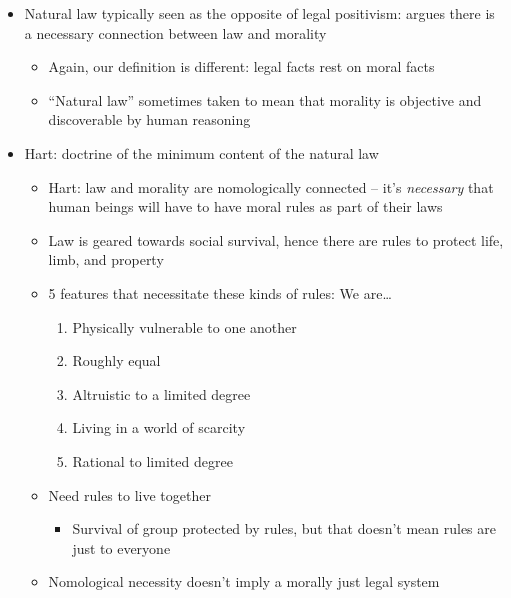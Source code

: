 \begin{itemize}
\tightlist
\item
  Natural law typically seen as the opposite of legal positivism: argues
  there is a necessary connection between law and morality

  \begin{itemize}
  \tightlist
  \item
    Again, our definition is different: legal facts rest on moral facts
  \item
    ``Natural law'' sometimes taken to mean that morality is objective
    and discoverable by human reasoning
  \end{itemize}
\item
  Hart: doctrine of the minimum content of the natural law

  \begin{itemize}
  \tightlist
  \item
    Hart: law and morality are nomologically connected -- it's
    \emph{necessary} that human beings will have to have moral rules as
    part of their laws
  \item
    Law is geared towards social survival, hence there are rules to
    protect life, limb, and property
  \item
    5 features that necessitate these kinds of rules: We are\ldots{}

    \begin{enumerate}
    \def\labelenumi{\arabic{enumi}.}
    \tightlist
    \item
      Physically vulnerable to one another
    \item
      Roughly equal
    \item
      Altruistic to a limited degree
    \item
      Living in a world of scarcity
    \item
      Rational to limited degree
    \end{enumerate}
  \item
    Need rules to live together

    \begin{itemize}
    \tightlist
    \item
      Survival of group protected by rules, but that doesn't mean rules
      are just to everyone
    \end{itemize}
  \item
    Nomological necessity doesn't imply a morally just legal system
  \end{itemize}
\end{itemize}

